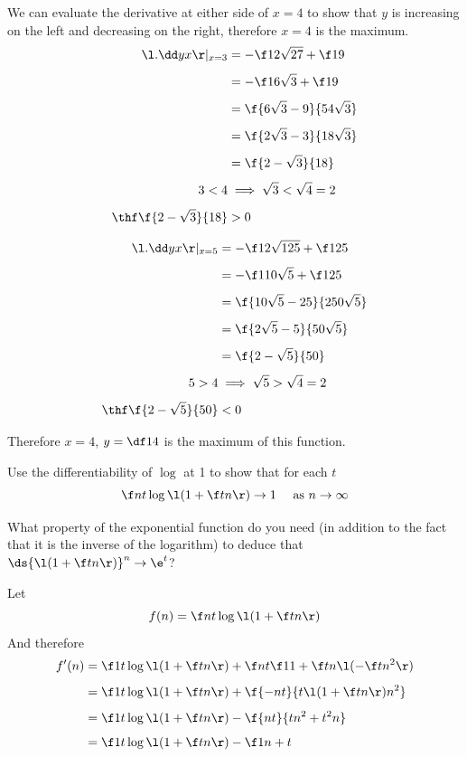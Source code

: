 \documentclass[a4paper]{article}
\begin{document}
We can evaluate the derivative at either side of $x=4$ to show that $y$ is increasing on the left and decreasing on the right, therefore $x=4$ is the maximum.
\begin{align*}
\l. \dd yx \r|_{x=3} &= -\f1{2 \sqrt{27}} + \f19 \\[1ex]
&= -\f1{6 \sqrt3} + \f19 \\[1ex]
&= \f{6 \sqrt3 - 9}{54 \sqrt3} \\[1ex]
&= \f{2 \sqrt3 - 3}{18 \sqrt3} \\[1ex]
&= \f{2 - \sqrt 3}{18} \\[1ex]
3 < 4 &\implies \sqrt 3 < \sqrt 4 = 2 \\[1ex]
\thf \f{2 - \sqrt 3}{18} &> 0
\end{align*}

\begin{align*}
\l. \dd yx \r|_{x=5} &= -\f1{2 \sqrt{125}} + \f1{25} \\[1ex]
&= -\f1{10 \sqrt5} + \f1{25} \\[1ex]
&= \f{10 \sqrt5 - 25}{250 \sqrt 5} \\[1ex]
&= \f{2 \sqrt5 - 5}{50 \sqrt 5} \\[1ex]
&= \f{2 - \sqrt5}{50} \\[1ex]
5 > 4 &\implies \sqrt 5 > \sqrt 4 = 2 \\[1ex]
\thf \f{2 - \sqrt5}{50} &< 0
\end{align*}

Therefore $x = 4$, $y = \df14$ is the maximum of this function.



\begin{questionbody}
Use the differentiability of $\log$ at 1 to show that for each $t$ \[
\f nt \log\l( 1 + \f tn \r) \to 1 \quad\text{ as } n \to \infty
\]

What property of the exponential function do you need (in addition to the fact that it is the inverse of the logarithm) to deduce that $\ds {\l( 1 + \f tn \r)}^n \to \e^t$?
\end{questionbody}

Let \[
f(n) = \f nt \log\l( 1 + \f tn \r)
\] And therefore \begin{align*}
f'(n) &= \f1t \log\l( 1 + \f tn \r) + \f nt \f1{1 + \f tn} \l(-\f t{n^2}\r) \\[1ex]
&= \f1t \log\l( 1 + \f tn \r) + \f{-nt}{t \l( 1 + \f tn \r) n^2} \\[1ex]
&= \f1t \log\l( 1 + \f tn \r) - \f{nt}{tn^2 + t^2n} \\[1ex]
&= \f1t \log\l( 1 + \f tn \r) - \f1{n + t}
\end{align*}
\end{document}
